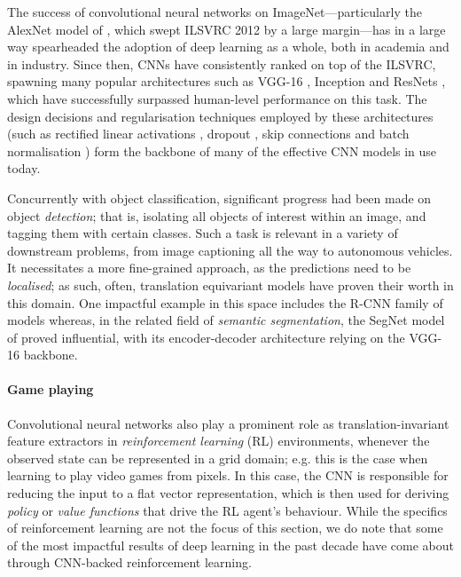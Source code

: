 The success of convolutional neural networks on ImageNet---particularly the AlexNet model of \citet{krizhevsky2012imagenet}, which swept ILSVRC 2012 by a large margin---has in a large way spearheaded the adoption of deep learning as a whole, both in academia and in industry. Since then, CNNs have consistently ranked on top of the ILSVRC, spawning many popular architectures such as VGG-16 \citep{simonyan2014very}, Inception \citep{szegedy2015going} and ResNets \citep{he2016deep}, which have successfully surpassed human-level performance on this task. The design decisions and regularisation techniques employed by these architectures (such as rectified linear activations \citep{nair2010rectified}, dropout \citep{srivastava2014dropout}, skip connections \citep{he2016deep} and batch normalisation \citep{ioffe2015batch}) form the backbone of many of the effective CNN models in use today.

Concurrently with object classification, significant progress had been made on object \emph{detection}; that is, isolating all objects of interest within an image, and tagging them with certain classes. Such a task is relevant in a variety of downstream problems, from image captioning all the way to autonomous vehicles. It necessitates a more fine-grained approach, as the predictions need to be \emph{localised}; as such, often, translation equivariant models have proven their worth in this domain. One impactful example in this space includes the R-CNN family of models \citep{girshick2014rich,girshick2015fast,ren2015faster,he2017mask} whereas, in the related field of \emph{semantic segmentation}, the SegNet model of \citet{badrinarayanan2017segnet} proved influential, with its encoder-decoder architecture relying on the VGG-16 backbone.

\paragraph{Game playing} Convolutional neural networks also play a prominent role as translation-invariant feature extractors in \emph{reinforcement learning} (RL) environments, whenever the observed state can be represented in a grid domain; e.g. this is the case when learning to play video games from pixels. %
%
In this case, the CNN is responsible for reducing the input to a flat vector representation, which is then used for deriving {\em policy} or {\em value functions} that drive the RL agent's behaviour. While the specifics of reinforcement learning are not the focus of this section, we do note that some of the most impactful results of deep learning in the past decade have come about through CNN-backed reinforcement learning.

